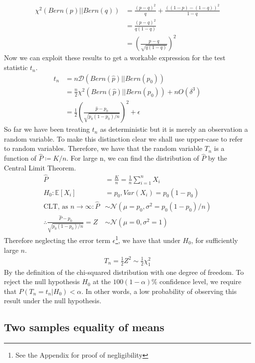 \documentclass[]{article}
\newcommand{\E}{\mathbb{E}}
\newcommand{\Gaussian}{\mathcal{N}}
\newcommand{\kl}{\mathcal{D}}
\begin{document}
%
\begin{align*}
\chi^2(Bern(p)||Bern(q)) &= \frac{(p-q)^2}{q} + \frac{((1-p)-(1-q))^2}{1-q} \\
&= \frac{(p-q)^2}{q(1-q)} \\
&= \left(\frac{p-q}{\sqrt{q(1-q)}}\right)^2
\end{align*}
%
Now we can exploit these results to get a workable expression for the test statistic $t_n$.
%
\begin{align*}
t_n &= n \kl \left(Bern(\hat{p}) || Bern(p_0)\right) \\
	&= \frac{n}{2} \chi^2 \left(Bern(\hat{p}) || Bern(p_0) \right) + nO(\delta^3) \\
	&= \frac{1}{2} \left( \frac{\hat{p} - p_0}{\sqrt{p_0(1-p_0)/n}} \right)^2 + \epsilon
\end{align*}
%
So far we have been treating $t_n$ as deterministic but it is merely an observation a random variable. To make this distinction clear we shall use upper-case to refer to random variables. Therefore, we have that the random variable $T_n$ is a function of $\hat{P} \coloneqq K/n$. For large n, we can find the distribution of $\hat{P}$ by the Central Limit Theorem.
%
\begin{align*}
\hat{P} &= \frac{K}{n} = \frac{1}{n} \sum_{i=1}^{n} X_i \\
H_0: \E[X_i] &= p_0, Var(X_i) = p_0(1-p_0) \\
\text{CLT, as }n \rightarrow \infty: \hat{P} &\sim \Gaussian\left(\mu=p_0, \sigma^2=p_0(1-p_0)/n\right) \\
\therefore \frac{\hat{P}-p_0}{\sqrt{p_0(1-p_0)/n}} = Z &\sim \Gaussian(\mu=0,\sigma^2=1)
\end{align*}
%
Therefore neglecting the error term $\epsilon$\footnote{See the Appendix for proof of negligibility}, we have that under $H_0$, for sufficiently large $n$.
%
\begin{align}
T_n = \frac{1}{2} Z^2 \sim \frac{1}{2} \chi_1^2
\end{align}
%
By the definition of the chi-squared distribution with one degree of freedom. To reject the null hypothesis $H_0$ at the $100(1-\alpha)\%$ confidence level, we require that $P(T_n = t_n | H_0) < \alpha$. In other words, a low probability of observing this result under the null hypothesis.

\subsection{Two samples equality of means}
\end{document}
